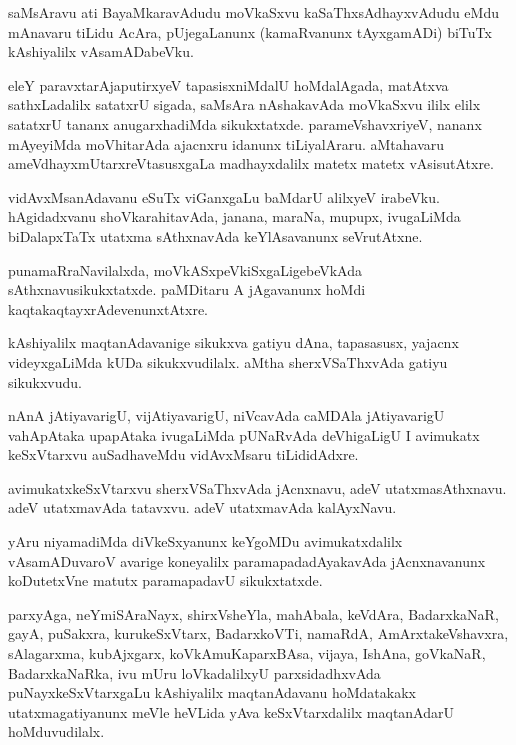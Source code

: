 \documentclass{article}
\begin{document}
\begin{mn}
saMsAravu ati BayaMkaravAdudu moVkaSxvu kaSaThxsAdhayxvAdudu eMdu mAnavaru tiLidu AcAra, 
pUjegaLanunx (kamaRvanunx tAyxgamADi) biTuTx kAshiyalilx vAsamADabeVku.
\end{mn}

\begin{mn}
eleY paravxtarAjaputirxyeV tapasisxniMdalU hoMdalAgada, matAtxva sathxLadalilx satatxrU sigada, 
saMsAra nAshakavAda moVkaSxvu ililx elilx satatxrU tananx anugarxhadiMda sikukxtatxde. 
parameVshavxriyeV, nananx mAyeyiMda moVhitarAda ajacnxru idanunx tiLiyalAraru. aMtahavaru 
ameVdhayxmUtarxreVtasusxgaLa madhayxdalilx matetx matetx vAsisutAtxre.
\end{mn}

\begin{mn}
vidAvxMsanAdavanu eSuTx viGanxgaLu baMdarU alilxyeV irabeVku. hAgidadxvanu shoVkarahitavAda, 
janana, maraNa, mupupx, ivugaLiMda biDalapxTaTx utatxma sAthxnavAda keYlAsavanunx seVrutAtxne.
\end{mn}

\begin{mn}
punamaRraNavilalxda, moVkASxpeVkiSxgaLigebeVkAda sAthxnavusikukxtatxde. 
paMDitaru A jAgavanunx hoMdi kaqtakaqtayxrAdevenunxtAtxre.
\end{mn}

\begin{mn}
kAshiyalilx maqtanAdavanige sikukxva gatiyu dAna, tapasasusx, yajacnx videyxgaLiMda kUDa 
sikukxvudilalx. aMtha sherxVSaThxvAda gatiyu sikukxvudu.
\end{mn}

\begin{mn}
nAnA jAtiyavarigU, vijAtiyavarigU, niVcavAda caMDAla jAtiyavarigU vahApAtaka upapAtaka ivugaLiMda 
pUNaRvAda deVhigaLigU I avimukatx keSxVtarxvu auSadhaveMdu vidAvxMsaru tiLididAdxre.
\end{mn}

\begin{mn}
avimukatxkeSxVtarxvu sherxVSaThxvAda jAcnxnavu, adeV utatxmasAthxnavu. adeV utatxmavAda tatavxvu. 
adeV utatxmavAda kalAyxNavu.
\end{mn}

\begin{mn}
yAru niyamadiMda diVkeSxyanunx keYgoMDu avimukatxdalilx vAsamADuvaroV avarige koneyalilx 
paramapadadAyakavAda jAcnxnavanunx koDutetxVne matutx paramapadavU sikukxtatxde.
\end{mn}

\begin{mn}
parxyAga, neYmiSAraNayx, shirxVsheYla, mahAbala, keVdAra, BadarxkaNaR, gayA, puSakxra, 
kurukeSxVtarx, BadarxkoVTi, namaRdA, AmArxtakeVshavxra, sAlagarxma, kubAjxgarx, koVkAmuKaparxBAsa,
vijaya, IshAna, goVkaNaR, BadarxkaNaRka, ivu mUru loVkadalilxyU parxsidadhxvAda puNayxkeSxVtarxgaLu
kAshiyalilx maqtanAdavanu hoMdatakakx utatxmagatiyanunx meVle heVLida yAva keSxVtarxdalilx 
maqtanAdarU hoMduvudilalx.
\end{mn}
\end{document}
